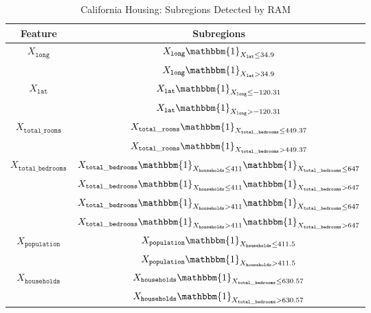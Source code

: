 \documentclass[runningheads]{llncs}
\newcommand{\when}[1]{\mathbbm{1}_{#1}}
\begin{document}
\begin{table}[htbp]
  \centering
  \caption{California Housing: Subregions Detected by RAM}
  \label{tab:california_housing_subregions}
  \begin{tabular}{c|c}
      Feature & Subregions \\
      \hline
      \multirow{2}{*}{$X_{\mathtt{long}}$} & $X_{\mathtt{long}} \when{X_{\mathtt{lat}} \leq 34.9}$ \\
      & $X_{\mathtt{long}} \when{X_{\mathtt{lat}} > 34.9}$ \\
      \hline
      \multirow{2}{*}{$X_{\mathtt{lat}}$} & $X_{\mathtt{lat}} \when{X_{\mathtt{long}} \leq -120.31}$ \\
      & $X_{\mathtt{lat}} \when{X_{\mathtt{long}} > -120.31}$ \\
      \hline
      \multirow{2}{*}{$X_{\mathtt{total\_rooms}}$} & $X_{\mathtt{total\_rooms}} \when{X_{\mathtt{total\_bedrooms}} \leq 449.37}$ \\
        & $X_{\mathtt{total\_rooms}} \when{X_{\mathtt{total\_bedrooms}} > 449.37}$ \\
      \hline
      \multirow{4}{*}{$X_{\mathtt{total\_bedrooms}}$} & $X_{\mathtt{total\_bedrooms}} \when{X_{\mathtt{households}} \leq 411} \when{X_{\mathtt{total\_bedrooms}} \leq 647}$ \\
        & $X_{\mathtt{total\_bedrooms}} \when{X_{\mathtt{households}} \leq 411} \when{X_{\mathtt{total\_bedrooms}} > 647}$ \\
        & $X_{\mathtt{total\_bedrooms}} \when{X_{\mathtt{households}} > 411} \when{X_{\mathtt{total\_bedrooms}} \leq 647}$ \\
        & $X_{\mathtt{total\_bedrooms}} \when{X_{\mathtt{households}} > 411} \when{X_{\mathtt{total\_bedrooms}} > 647}$ \\
      \hline
      \multirow{2}{*}{$X_{\mathtt{population}}$} & $X_{\mathtt{population}} \when{X_{\mathtt{households}} \leq 411.5}$ \\
      & $X_{\mathtt{population}} \when{X_{\mathtt{households}} > 411.5}$ \\
      \hline
      \multirow{2}{*}{$X_{\mathtt{households}}$} & $X_{\mathtt{households}} \when{X_{\mathtt{total\_bedrooms}} \leq 630.57}$ \\
        & $X_{\mathtt{households}} \when{X_{\mathtt{total\_bedrooms}} > 630.57}$ \\
  \end{tabular}
\end{table}
\end{document}
